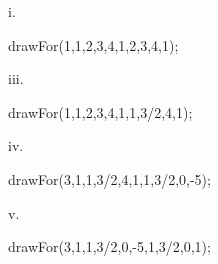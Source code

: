 \documentclass[../gatm.tex]{subfiles}
\begin{document}
\begin{figure}[h]
	\begin{center}
		\begin{minipage}[c]{0.45\textwidth}
			\begin{center}
				\begin{minipage}[b]{0.45\textwidth}
					i.
					\centering
					\begin{asy}[width=0.7\textwidth]
						drawFor(1,1,2,3,4,1,2,3,4,1);
					\end{asy}
				\end{minipage}
				\hfill
				\begin{minipage}[b]{0.45\textwidth}
					iii.
					\centering
					\begin{asy}[width=0.7\textwidth]
						drawFor(1,1,2,3,4,1,1,3/2,4,1);
					\end{asy}
				\end{minipage}
			\end{center}
		
			\begin{center}
				\begin{minipage}[b]{0.45\textwidth}
					iv.
					\centering
					\begin{asy}[width=0.7\textwidth]
						drawFor(3,1,1,3/2,4,1,1,3/2,0,-5);
					\end{asy}
				\end{minipage}
				\hfill
				\begin{minipage}[b]{0.45\textwidth}
					v.
					\centering
					\begin{asy}[width=0.7\textwidth]
						drawFor(3,1,1,3/2,0,-5,1,3/2,0,1);
					\end{asy}
				\end{minipage}
			\end{center}
		

\end{minipage}
\end{center}
\end{figure}
\end{document}
